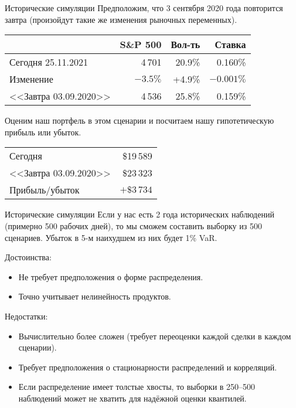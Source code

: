 \documentclass{beamer}
\begin{document}
\begin{frame}{Исторические симуляции}
\justify
Предположим, что 3 сентября 2020 года повторится завтра (произойдут такие же изменения рыночных переменных).

\justify
\centering
\begin{tabular}{l|r|r|r}
                      & S\&P 500 & Вол-ть   & Ставка \\ \hline
Сегодня 25.11.2021    & 4\,701   & 20.9\%   & 0.160\% \\
Изменение             & $-3.5\%$ & +4.9\%   & $-0.001\%$ \\ \hline
<<Завтра 03.09.2020>> & 4\,536   & 25.8\%   & 0.159\%
\end{tabular}

\justify
Оценим наш портфель в этом сценарии и посчитаем нашу гипотетическую прибыль или убыток.

\justify
\centering
\begin{tabular}{l|r}
Сегодня               & \$19\,589 \\
<<Завтра 03.09.2020>> & \$23\,323 \\ \hline
Прибыль/убыток        & $+\$3\,734$
\end{tabular}
\end{frame}



\begin{frame}{Исторические симуляции}
\justify
Если у нас есть 2 года исторических наблюдений (примерно 500 рабочих дней), то мы сможем составить выборку из 500 сценариев. Убыток в 5-м наихудшем из них будет 1\% VaR.

\justify
Достоинства:
\begin{itemize}
\justifying
\item Не требует предположения о форме распределения.
\item Точно учитывает нелинейность продуктов.
\end{itemize}

\justify
Недостатки:
\begin{itemize}
\justifying
\item Вычислительно более сложен (требует переоценки каждой сделки в каждом сценарии).
\item Требует предположения о стационарности распределений и корреляций.
\item Если распределение имеет толстые хвосты, то выборки в 250--500 наблюдений может не хватить для надёжной оценки квантилей.
\end{itemize}
\end{frame}
\end{document}
